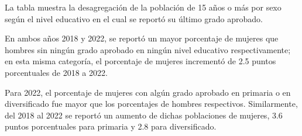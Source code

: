La tabla muestra la desagregación de la población de 15 años o más por sexo según el nivel educativo en el cual se reportó su último grado aprobado. 

En ambos años 2018 y 2022, se reportó un mayor porcentaje de mujeres que hombres sin ningún grado aprobado en ningún nivel educativo respectivamente; en esta misma categoría, el porcentaje de mujeres incrementó de 2.5 puntos porcentuales de 2018 a 2022. 

Para 2022, el porcentaje de mujeres con algún grado aprobado en primaria o en diversificado fue mayor que los porcentajes de hombres respectivos. Similarmente, del 2018 al 2022 se reportó un aumento de dichas poblaciones de mujeres, 3.6 puntos porcentuales para primaria y 2.8 para diversificado. 